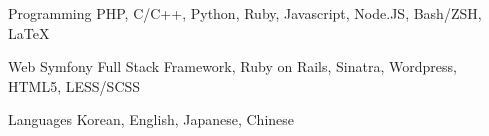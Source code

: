 

\begin{cvskills}

  \cvskill
    {Programming} %
    {PHP, C/C++, Python, Ruby, Javascript, Node.JS, Bash/ZSH, LaTeX} %

  \cvskill
    {Web} %
    {Symfony Full Stack Framework, Ruby on Rails, Sinatra, Wordpress, HTML5, LESS/SCSS} %

  \cvskill
    {Languages} %
    {Korean, English, Japanese, Chinese} %

\end{cvskills}

